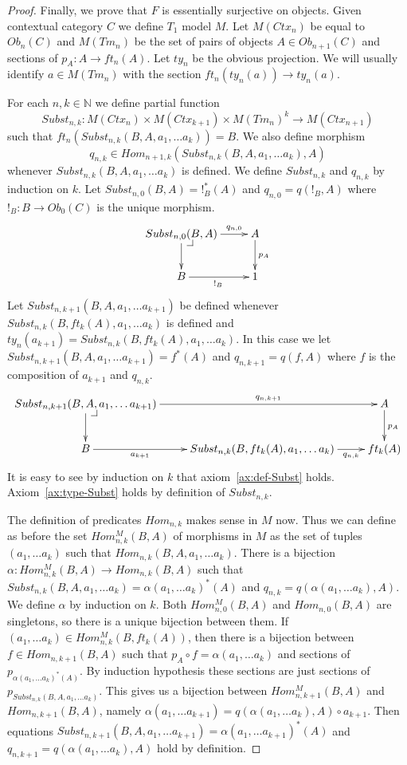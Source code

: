 \documentclass{amsart}
\makeatletter
\theoremstyle{definition}
\theoremstyle{remark}
\numberwithin{figure}{section}
\newcommand{\pb}[1][dr]{\save*!/#1-1.2pc/#1:(-1,1)@^{|-}\restore}
\makeatother
\begin{document}
\begin{proof}
Finally, we prove that $F$ is essentially surjective on objects.
Given contextual category $C$ we define $T_1$ model $M$.
Let $M(Ctx_n)$ be equal to $Ob_n(C)$ and $M(Tm_n)$ be the set of pairs of objects $A \in Ob_{n+1}(C)$ and sections of $p_A : A \to ft_n(A)$.
Let $ty_n$ be the obvious projection.
We will usually identify $a \in M(Tm_n)$ with the section $ft_n(ty_n(a)) \to ty_n(a)$.

For each $n,k \in \mathbb{N}$ we define partial function
\[ Subst_{n,k} : M(Ctx_n) \times M(Ctx_{k+1}) \times M(Tm_n)^k \to M(Ctx_{n+1}) \]
such that $ft_n(Subst_{n,k}(B, A, a_1, \ldots a_k)) = B$.
We also define morphism
\[ q_{n,k} \in Hom_{n+1,k}(Subst_{n,k}(B, A, a_1, \ldots a_k), A) \]
whenever $Subst_{n,k}(B, A, a_1, \ldots a_k)$ is defined.
We define $Subst_{n,k}$ and $q_{n,k}$ by induction on $k$.
Let $Subst_{n,0}(B,A) = !_B^*(A)$ and $q_{n,0} = q(!_B,A)$ where $!_B : B \to Ob_0(C)$ is the unique morphism.
\[ \xymatrix{ Subst_{n,0}(B,A) \ar[r]^-{q_{n,0}} \ar[d] \pb & A \ar[d]^{p_A} \\
              B \ar[r]_{!_B} & 1
            } \]
Let $Subst_{n,k+1}(B, A, a_1, \ldots a_{k+1})$ be defined whenever $Subst_{n,k}(B, ft_k(A), a_1, \ldots a_k)$ is defined and $ty_n(a_{k+1}) = Subst_{n,k}(B, ft_k(A), a_1, \ldots a_k)$.
In this case we let $Subst_{n,k+1}(B, A, a_1, \ldots a_{k+1}) = f^*(A)$ and $q_{n,k+1} = q(f,A)$ where $f$ is the composition of $a_{k+1}$ and $q_{n,k}$.
\[ \xymatrix{ Subst_{n,k+1}(B, A, a_1, \ldots a_{k+1}) \ar[rr]^-{q_{n,k+1}} \ar[d] \pb & & A \ar[d]^{p_A} \\
              B \ar[r]_-{a_{k+1}} & Subst_{n,k}(B, ft_k(A), a_1, \ldots a_k) \ar[r]_-{q_{n,k}} & ft_k(A)
            } \]
It is easy to see by induction on $k$ that axiom~\eqref{ax:def-Subst} holds.
Axiom~\eqref{ax:type-Subst} holds by definition of $Subst_{n,k}$.

The definition of predicates $Hom_{n,k}$ makes sense in $M$ now.
Thus we can define as before the set $Hom^M_{n,k}(B,A)$ of morphisms in $M$ as the set of tuples $(a_1, \ldots a_k)$ such that $Hom_{n,k}(B, A, a_1, \ldots a_k)$.
There is a bijection $\alpha : Hom^M_{n,k}(B,A) \to Hom_{n,k}(B,A)$ such that $Subst_{n,k}(B, A, a_1, \ldots a_k) = \alpha(a_1, \ldots a_k)^*(A)$ and $q_{n,k} = q(\alpha(a_1, \ldots a_k), A)$.
We define $\alpha$ by induction on $k$.
Both $Hom^M_{n,0}(B,A)$ and $Hom_{n,0}(B,A)$ are singletons, so there is a unique bijection between them.
If $(a_1, \ldots a_k) \in Hom^M_{n,k}(B,ft_k(A))$, then there is a bijection between $f \in Hom_{n,k+1}(B,A)$ such that $p_A \circ f = \alpha(a_1, \ldots a_k)$ and sections of $p_{\alpha(a_1, \ldots a_k)^*(A)}$.
By induction hypothesis these sections are just sections of $p_{Subst_{n,k}(B, A, a_1, \ldots a_k)}$.
This gives us a bijection between $Hom^M_{n,k+1}(B,A)$ and $Hom_{n,k+1}(B,A)$, namely $\alpha(a_1, \ldots a_{k+1}) = q(\alpha(a_1, \ldots a_k), A) \circ a_{k+1}$.
Then equations $Subst_{n,k+1}(B, A, a_1, \ldots a_{k+1}) = \alpha(a_1, \ldots a_{k+1})^*(A)$ and $q_{n,k+1} = q(\alpha(a_1, \ldots a_k), A)$ hold by definition.


\end{proof}
\end{document}
